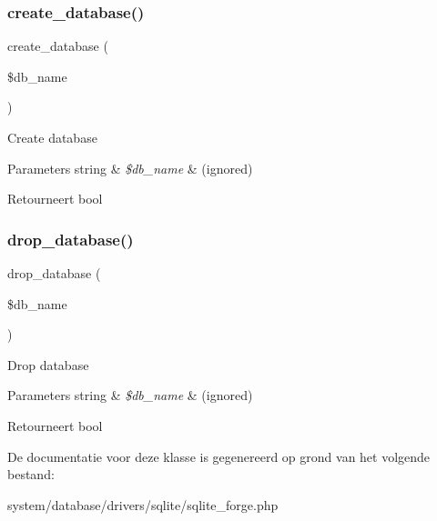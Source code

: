 \subsubsection{\texorpdfstring{create\_database()}{create\_database()}}
{\footnotesize\ttfamily create\+\_\+database (\begin{DoxyParamCaption}\item[{}]{\$db\+\_\+name }\end{DoxyParamCaption})}

Create database


\begin{DoxyParams}[1]{Parameters}
string & {\em \$db\+\_\+name} & (ignored) \\
\hline
\end{DoxyParams}
\begin{DoxyReturn}{Retourneert}
bool 
\end{DoxyReturn}
\mbox{\label{class_c_i___d_b__sqlite__forge_a9612987b2d4230de2638d15857e92e67}} 
\subsubsection{\texorpdfstring{drop\_database()}{drop\_database()}}
{\footnotesize\ttfamily drop\+\_\+database (\begin{DoxyParamCaption}\item[{}]{\$db\+\_\+name }\end{DoxyParamCaption})}

Drop database


\begin{DoxyParams}[1]{Parameters}
string & {\em \$db\+\_\+name} & (ignored) \\
\hline
\end{DoxyParams}
\begin{DoxyReturn}{Retourneert}
bool 
\end{DoxyReturn}


De documentatie voor deze klasse is gegenereerd op grond van het volgende bestand\+:\begin{DoxyCompactItemize}
\item 
system/database/drivers/sqlite/sqlite\+\_\+forge.\+php\end{DoxyCompactItemize}
